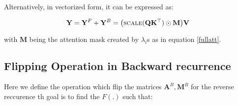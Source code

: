 Alternatively, in vectorized form, it can be expressed as:

\begin{equation}
    \mathbf{Y} = \mathbf{Y}^{F}+ \mathbf{Y}^{B} = \big(\textsc{scale}(\mathbf{Q}\mathbf{K}^{\top} )\odot \mathbf{M}\big) \mathbf{V}
\end{equation}

with $\mathbf{M}$ being the attention mask created by ${\lambda}_i$s as in equation \ref{fullatt}.


\subsection{Flipping Operation in Backward recurrence}
\label{ap:flip}
Here we define the operation which flip the matrices $\mathbf{A}^B , \mathbf{M}^B$ for the reverse reccurence th goal is to find the $F(.)$ such that:


